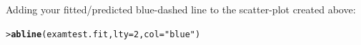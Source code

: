 \documentclass{beamer}\usepackage[]{graphicx}\usepackage[]{xcolor}
\makeatletter
\newcommand{\hlnum}[1]{\textcolor[rgb]{0.686,0.059,0.569}{#1}}%
\newcommand{\hlstr}[1]{\textcolor[rgb]{0.192,0.494,0.8}{#1}}%
\newcommand{\hlstd}[1]{\textcolor[rgb]{0.345,0.345,0.345}{#1}}%
\newcommand{\hlkwc}[1]{\textcolor[rgb]{0.333,0.667,0.333}{#1}}%
\newcommand{\hlkwd}[1]{\textcolor[rgb]{0.737,0.353,0.396}{\textbf{#1}}}%
\newenvironment{kframe}{%
 \def\at@end@of@kframe{}%
 \ifinner\ifhmode%
  \def\at@end@of@kframe{\end{minipage}}%
  \begin{minipage}{\columnwidth}%
 \fi\fi%
 \def\FrameCommand##1{\hskip\@totalleftmargin \hskip-\fboxsep
 \colorbox{shadecolor}{##1}\hskip-\fboxsep
     \hskip-\linewidth \hskip-\@totalleftmargin \hskip\columnwidth}%
 \MakeFramed {\advance\hsize-\width
   \@totalleftmargin\z@ \linewidth\hsize
   \@setminipage}}%
 {\par\unskip\endMakeFramed%
 \at@end@of@kframe}
\newenvironment{knitrout}{}{} %
\makeatother
\begin{document}
\begin{frame}[fragile]
Adding your fitted/predicted blue-dashed line to the scatter-plot created above:

\begin{knitrout}\scriptsize
{}\color{fgcolor}\begin{kframe}
\begin{alltt}
\hlstd{> }\hlkwd{abline}\hlstd{(examtest.fit,} \hlkwc{lty} \hlstd{=} \hlnum{2}\hlstd{,} \hlkwc{col} \hlstd{=} \hlstr{"blue"}\hlstd{)}
\end{alltt}
\end{kframe}
\end{knitrout}

\end{frame}
\end{document}
